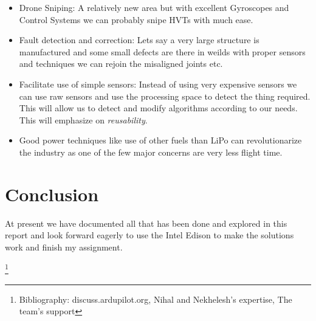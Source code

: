 \documentclass[12pt]{report}
\begin{document}
\begin{itemize}
\item Drone Sniping: A relatively new area but with excellent Gyroscopes and Control Systems we can probably snipe HVTs with much ease.
\item Fault detection and correction: Lets say a very large structure is manufactured and some small defects are there in weilds with proper sensors and techniques we can rejoin the misaligned joints etc.
\item Facilitate use of simple sensors: Instead of using very expensive sensors we can use raw sensors and use the processing space to detect the thing required. This will allow us to detect and modify algorithms according to our needs. This will emphasize on \emph{reusability}.
\item Good power techniques like use of other fuels than LiPo can revolutionarize the industry as one of the few major concerns are very less flight time.



\end{itemize}

\chapter{Conclusion}
At present we have documented all that has been done and explored in this report and look forward eagerly to use the Intel Edison to make the solutions work and finish my assignment. 



\footnote{Bibliography: discuss.ardupilot.org, Nihal and Nekhelesh's expertise, The team's support }
\end{document}
